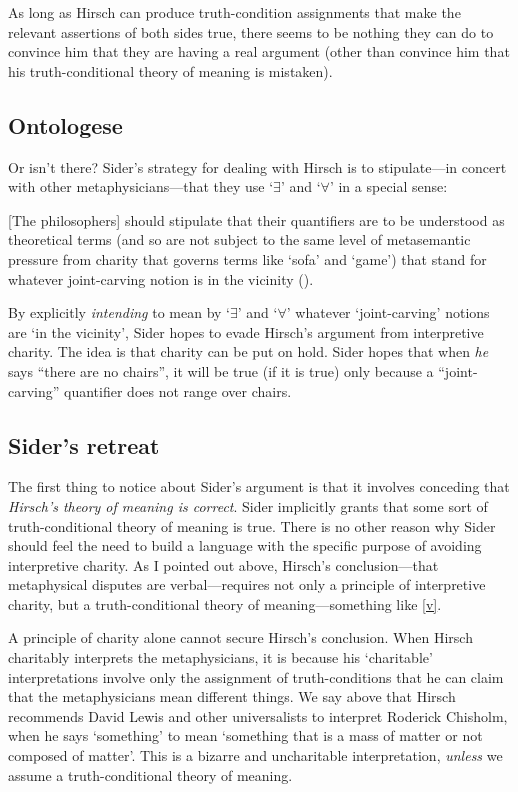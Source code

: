 \documentclass[11pt]{article}
\newenvironment{squote}{%
\begin{spacing}{1}
       	\begin{list}{}{%
\setlength{\labelwidth}{0pt}%
\rightmargin\leftmargin%
}
\item\relax
}{%
\end{list}%
\end{spacing}
}
\begin{document}
\begin{spacing}{1.25}
As long as Hirsch can produce truth-condition assignments that make
the relevant assertions of both sides true, there seems to be nothing
they can do to convince him that they are having a real argument
(other than convince him that his truth-conditional theory of meaning
is mistaken).

\subsection{Ontologese}
Or isn't there?  Sider's strategy for dealing with Hirsch is to
stipulate---in concert with other metaphysicians---that they use
`$\exists$' and `$\forall$' in a special sense:

\begin{squote}
{[}The philosophers{]} should stipulate that their quantifiers are to be
understood as theoretical terms (and so are not subject to the same
level of metasemantic pressure from charity that governs terms like
`sofa' and `game') that stand for whatever joint-carving notion is in
the vicinity (\citeyear[9]{sider2011b}).
\end{squote}

By explicitly \emph{intending} to mean by `$\exists$' and `$\forall$'
whatever `joint-carving' notions are `in the vicinity', Sider hopes to
evade Hirsch's argument from interpretive charity.  The idea is that
charity can be put on hold.  Sider hopes that when {\em he} says
``there are no chairs'', it will be true (if it is true) only because
a ``joint-carving'' quantifier does not range over chairs.

\subsection{Sider's retreat}
The first thing to notice about Sider's argument is that it involves
conceding that {\em Hirsch's theory of meaning is correct}.  Sider
implicitly grants that some sort of truth-conditional theory of
meaning is true.  There is no other reason why Sider should feel the
need to build a language with the specific purpose of avoiding
interpretive charity.  As I pointed out above, Hirsch's
conclusion---that metaphysical disputes are verbal---requires not only
a principle of interpretive charity, but a truth-conditional theory of
meaning---something like \ref{v}.

A principle of charity alone cannot secure Hirsch's conclusion.  When
Hirsch charitably interprets the metaphysicians, it is because his
`charitable' interpretations involve only the assignment of
truth-conditions that he can claim that the metaphysicians mean
different things.  We say above that Hirsch recommends David Lewis and
other universalists to interpret Roderick Chisholm, when he says
`something' to mean `something that is a mass of matter or not
composed of matter'.  This is a bizarre and uncharitable
interpretation, {\em unless} we assume a truth-conditional theory of
meaning.


\end{spacing}
\end{document}
